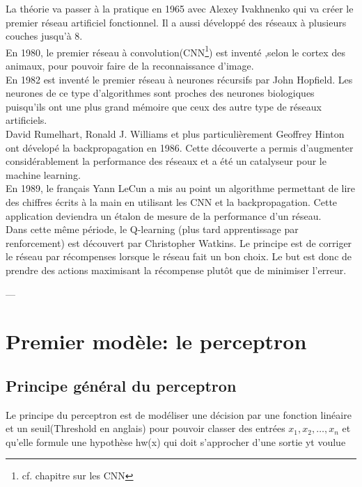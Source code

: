 \documentclass[openany,14pt,fleqn]{book} %
\begin{document}
La théorie va passer à la pratique en 1965 avec Alexey Ivakhnenko qui va créer le premier réseau artificiel fonctionnel. Il a aussi développé des réseaux à plusieurs couches jusqu'à 8.\\
En 1980, le premier réseau à convolution(CNN\footnote{cf. chapitre sur les CNN}) est inventé ,selon le cortex des animaux, pour pouvoir faire de la reconnaissance d'image.\\
En 1982 est inventé le premier réseau à neurones récursifs par John Hopfield. Les neurones de ce type d'algorithmes sont proches des neurones biologiques puisqu'ils ont une plus grand mémoire que ceux des autre type de réseaux artificiels.\\
David Rumelhart, Ronald J. Williams et plus particulièrement Geoffrey Hinton ont dévelopé la backpropagation en 1986. Cette découverte a permis d'augmenter considérablement la performance des réseaux et a été un catalyseur pour le machine learning.\\
En 1989, le français Yann LeCun a mis au point un algorithme permettant de lire des chiffres écrits à la main en utilisant les CNN et la backpropagation. Cette application deviendra un étalon de mesure de la performance d'un réseau.\\
Dans cette même période, le Q-learning (plus tard apprentissage par renforcement) est découvert par Christopher Watkins. Le principe est de corriger le réseau par récompenses lorsque le réseau fait un bon choix. Le but est donc de prendre des actions maximisant la récompense plutôt que de minimiser l'erreur.\cite{history,wiki_history}






---







\chapter{Premier modèle: le perceptron}
\section{Principe général du perceptron}
Le principe du perceptron est de modéliser une décision par une fonction linéaire et un seuil(Threshold en anglais) pour pouvoir classer des entrées $x_1,x_2,\dots,x_n$ et qu'elle formule une hypothèse hw(x) qui doit s'approcher d'une sortie yt voulue\cite{3Blue1Brown,Hugo_Larochelle4,giant_neural}
\end{document}
